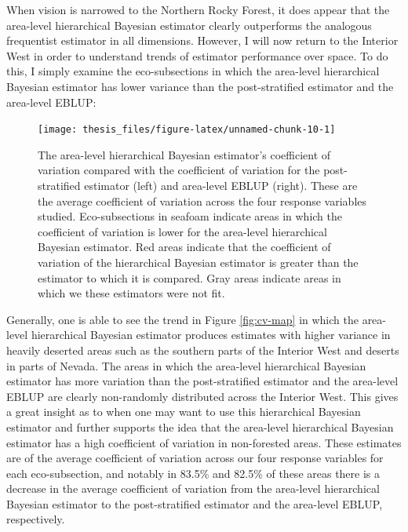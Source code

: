 \documentclass[12pt,twoside]{reedthesis}
\begin{document}
When vision is narrowed to the Northern Rocky Forest, it does appear that the area-level hierarchical Bayesian estimator clearly outperforms the analogous frequentist estimator in all dimensions. However, I will now return to the Interior West in order to understand trends of estimator performance over space. To do this, I simply examine the eco-subsections in which the area-level hierarchical Bayesian estimator has lower variance than the post-stratified estimator and the area-level EBLUP:
\begin{figure}

{\centering \texttt{[image: thesis\_files/figure-latex/unnamed-chunk-10-1]} 

}

\caption[Area-level coefficient of variation comparison across the Interior West]{The area-level hierarchical Bayesian estimator's coefficient of variation compared with the coefficient of variation for the post-stratified estimator (left) and area-level EBLUP (right). These are the average coefficient of variation across the four response variables studied. Eco-subsections in seafoam indicate areas in which the coefficient of variation is lower for the area-level hierarchical Bayesian estimator. Red areas indicate that the coefficient of variation of the hierarchical Bayesian estimator is greater than the estimator to which it is compared. Gray areas indicate areas in which we these estimators were not fit.}\label{fig:unnamed-chunk-10}
\end{figure}
Generally, one is able to see the trend in Figure \ref{fig:cv-map} in which the area-level hierarchical Bayesian estimator produces estimates with higher variance in heavily deserted areas such as the southern parts of the Interior West and deserts in parts of Nevada. The areas in which the area-level hierarchical Bayesian estimator has more variation than the post-stratified estimator and the area-level EBLUP are clearly non-randomly distributed across the Interior West. This gives a great insight as to when one may want to use this hierarchical Bayesian estimator and further supports the idea that the area-level hierarchical Bayesian estimator has a high coefficient of variation in non-forested areas. These estimates are of the average coefficient of variation across our four response variables for each eco-subsection, and notably in 83.5\% and 82.5\% of these areas there is a decrease in the average coefficient of variation from the area-level hierarchical Bayesian estimator to the post-stratified estimator and the area-level EBLUP, respectively.
\end{document}
